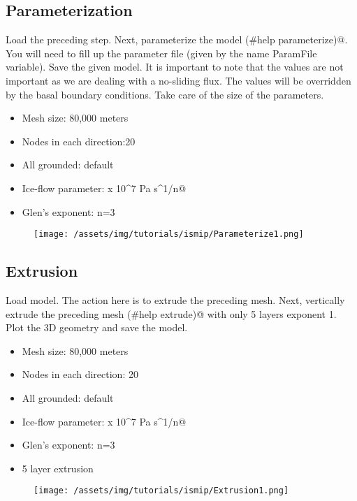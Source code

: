 \subsection{Parameterization} %
Load the preceding step. Next, parameterize the model \verb@(#help parameterize)@. You will need to fill up the parameter file (given by the name ParamFile variable). Save the given model. It is important to note that the values are not important as we are dealing with a no-sliding flux. The values will be overridden by the basal boundary conditions. Take care of the size of the parameters.
\begin{itemize}
	\item Mesh size: 80,000 meters
	\item Nodes in each direction:20
	\item All grounded: default
	\item Ice-flow parameter:  x 10^7 Pa s^1/n@
	\item Glen's exponent: n=3
\end{itemize}
\begin{figure}[H]
	\begin{center}
		\texttt{[image: /assets/img/tutorials/ismip/Parameterize1.png]}
	\end{center}
\end{figure}
\subsection{Extrusion} %
Load \verb@Parameterization@ model. The action here is to extrude the preceding mesh. Next, vertically
extrude the preceding mesh \verb@(#help extrude)@ with only 5 layers exponent 1. Plot the 3D
geometry and save the model.
\begin{itemize}
	\item Mesh size: 80,000 meters
	\item Nodes in each direction: 20
	\item All grounded: default
	\item Ice-flow parameter:  x 10^7 Pa s^1/n@
	\item Glen's exponent: n=3
	\item 5 layer extrusion
\end{itemize}
\begin{figure}[H]
	\begin{center}
		\texttt{[image: /assets/img/tutorials/ismip/Extrusion1.png]}
	\end{center}
\end{figure}
